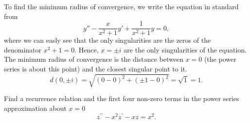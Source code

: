 \documentclass[11pt]{article}
\begin{document}
\begin{solution}
To find the minimum radius of convergence, we write the equation in standard from
\[y''-\frac{x}{x^{2}+1}y'+ \frac{1}{x^{2}+1}y = 0,\]
where we can easly see that the only singularities are the zeros of the denominator $x^{2}+1=0$. Hence, $x=\pm i$ are the only singularities of the equation. The minimum radius of convergence is the distance between $x=0$ (the power series is about this point) and the closest singular point to it.
\[d(0,\pm i) = \sqrt{(0-0)^{2}+(\pm 1-0)^{2}}=\sqrt{1} = 1.\]


\end{solution}



\begin{problem}
{Find a recurrence relation and the first four non-zero terms in the power series approximation about $x=0$}
\begin{equation*}
z^{\prime \prime} - x^2 z^{\prime} - xz =x^2.
\end{equation*}
\end{problem}
\end{document}

